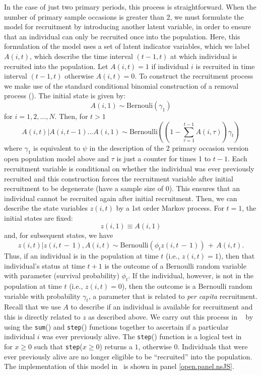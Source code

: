In the case of just two primary periods, this process is
straightforward.  When the number of primary sample occasions is
greater than 2, we must formulate the model for recruitment by
introducing another latent variable, in order to ensure
that an individual can only be recruited once into the population.
Here, this formulation of the model uses a set of latent indicator
variables, which we label $A(i,t)$,
which describe the time interval $(t-1, t)$ at
which individual is recruited into the population.  Let $A(i,t) = 1$
if individual $i$ is recruited in time interval $(t-1, t)$ otherwise
$A(i,t)=0$.  To construct the recruitment process we make use of the
standard conditional binomial construction of a removal process
(\citealt{royle_dorazio:2008}).  The initial state is given by:
\[
   A(i,1) \sim \mbox{Bernouli}(\gamma_{1})
\]
for $i=1,2,\ldots,N$. Then, for $t>1$
\[
 A(i,t)|A(i, t-1) \dots A(i, 1) \sim \mbox{Bernoulli}((1 - \sum_{\tau=1}^{t-1} A(i, \tau) ) \gamma_{t})
\]
where $\gamma_1$ is equivalent to $\psi$ in the description of the 2 primary occasion version open population model above and
$\tau$ is just a counter for times 1 to $t-1$.
Each recruitment variable is conditional on whether the individual was ever
previously recruited and this construction forces the recruitment
variable after initial recruitment to be degenerate (have a sample
size of 0).  This ensures that an individual cannot be recruited again after initial recruitment.
Then, we can describe the state variables $z(i,t)$ by a
1st order Markov process.  For $t=1$, the initial states are fixed:
\[
z(i,1) \equiv A(i,1)
\]
and,
 for subsequent states, we have
\[
z(i,t)|z(i,t\,-\,1),A(i,t)
 \sim \mbox{Bernoulli} (\phi_{t} z(i,t\,-\,1)) \,+ \,  A(i,t).
\]
Thus, if an individual is in the population at time $t$ (i.e., $z(i,t)
= 1$), then that individual's status at time $t+1$ is the outcome of a
Bernoulli random variable with parameter (survival probability)
$\phi_{t}$.  If the individual, however, is not in the population at
time $t$ (i.e., $z(i,t) = 0$), then the outcome is a Bernoulli random
variable with probability $\gamma_{t}$, a parameter that is related to
{\it per capita} recruitment.  Recall that we use $A$ to describe if an individual
is available for recruitment and this is directly related to $z$ as described
above.  We carry out this process in \jags~ by
using the \mbox{\tt sum}() and \mbox{\tt step}() functions together to
ascertain if a particular individual $i$ was ever previously alive.
The \mbox{\tt step}() function is a logical test in \jags~ for $x \geq 0$
such that \mbox{\tt step}($x \geq 0$) returns a $1$, otherwise $0$.
Individuals that were ever previously alive are no longer eligible to
be ``recruited'' into the population.  The implementation of this model
in \jags~is shown in panel \ref{open.panel.nsJS}.


